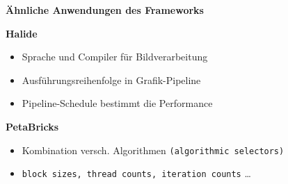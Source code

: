 %    

 \begingroup
\begin{frame}
  \textbf{Ähnliche Anwendungen des Frameworks} \newline
  
 
  \textbf{Halide}
  \begin{itemize}
    \item Sprache und Compiler für Bildverarbeitung
    \item Ausführungsreihenfolge in Grafik-Pipeline
    \item Pipeline-Schedule bestimmt die Performance
   \end{itemize}
      
   \text{}
   
   \textbf{PetaBricks}
   \begin{itemize}
     \item Kombination versch. Algorithmen \texttt{(algorithmic selectors)}
     \item \texttt{block sizes, thread counts, iteration counts} \ldots
   \end{itemize}
\end{frame}
\endgroup
    
 \begingroup

